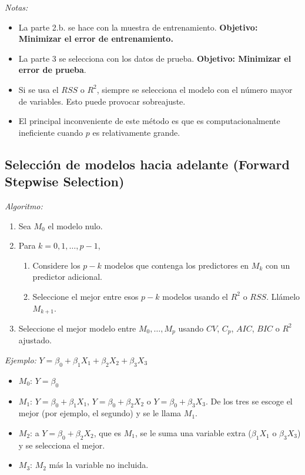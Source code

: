 \documentclass[
  12pt,
]{book}
\providecommand{\tightlist}{%
  \setlength{\itemsep}{0pt}\setlength{\parskip}{0pt}}
\begin{document}
\emph{Notas:}

\begin{itemize}
\tightlist
\item
  La parte 2.b. se hace con la muestra de entrenamiento.
  \textbf{Objetivo: Minimizar el error de entrenamiento.}
\item
  La parte 3 se selecciona con los datos de prueba. \textbf{Objetivo:
  Minimizar el error de prueba}.
\item
  Si se usa el \(RSS\) o \(R^2\), siempre se selecciona el modelo con el
  número mayor de variables. Esto puede provocar sobreajuste.
\item
  El principal inconveniente de este método es que es computacionalmente
  ineficiente cuando \(p\) es relativamente grande.
\end{itemize}

\hypertarget{selecciuxf3n-de-modelos-hacia-adelante-forward-stepwise-selection}{%
\subsection{\texorpdfstring{Selección de modelos hacia adelante
(\textbf{Forward Stepwise
Selection})}{Selección de modelos hacia adelante (Forward Stepwise Selection)}}\label{selecciuxf3n-de-modelos-hacia-adelante-forward-stepwise-selection}}

\emph{Algoritmo:}

\begin{enumerate}
\def\labelenumi{\arabic{enumi}.}
\tightlist
\item
  Sea \(M_0\) el modelo nulo.
\item
  Para \(k=0,1,\dots,p-1\),

  \begin{enumerate}
  \def\labelenumii{\alph{enumii}.}
  \tightlist
  \item
    Considere los \(p-k\) modelos que contenga los predictores en
    \(M_k\) con un predictor adicional.
  \item
    Seleccione el mejor entre esos \(p-k\) modelos usando el \(R^2\) o
    \(RSS\). Llámelo \(M_{k+1}\).
  \end{enumerate}
\item
  Seleccione el mejor modelo entre \(M_0,\dots, M_p\) usando \(CV\),
  \(C_p\), \(AIC\), \(BIC\) o \(R^2\) ajustado.
\end{enumerate}

\emph{Ejemplo:} \(Y=\beta_0+\beta_1X_1+\beta_2X_2+\beta_3X_3\)

\begin{itemize}
\item
  \(M_0\): \(Y = \beta_0\)
\item
  \(M_1\): \(Y = \beta_0+\beta_1X_1\), \(Y = \beta_0+\beta_2X_2\) o
  \(Y = \beta_0+\beta_3X_3\). De los tres se escoge el mejor (por
  ejemplo, el segundo) y se le llama \(M_1\).
\item
  \(M_2\): a \(Y = \beta_0+\beta_2X_2\), que es \(M_1\), se le suma una
  variable extra (\(\beta_1X_1\) o \(\beta_3X_3\)) y se selecciona el
  mejor.
\item
  \(M_3\): \(M_2\) más la variable no incluida.
\end{itemize}
\end{document}
